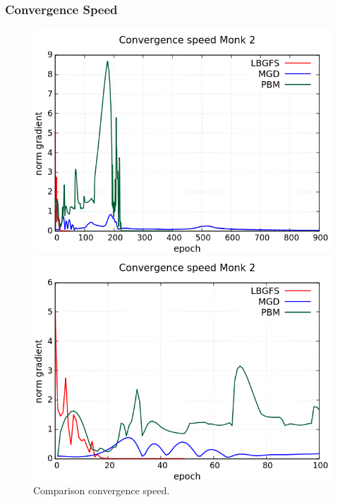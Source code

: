\subsubsection{Convergence Speed}
\begin{figure}[H]
	\centering
	\begin{minipage}[t]{0.5\linewidth}
		\includegraphics[width=\linewidth]{img/Monk2_CS_Comparison_standard.png}
	\end{minipage}%
	\begin{minipage}[t]{0.5\linewidth}
		\includegraphics[width=\linewidth]{img/Monk2_CS_Comparison_zoom.png}
	\end{minipage}
	\caption{Comparison convergence speed.}
\end{figure}
